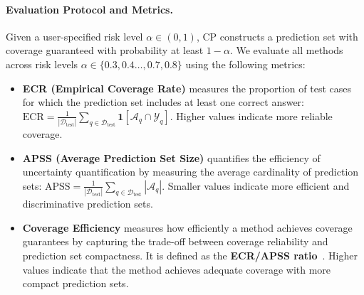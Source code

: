 \documentclass{article}
\theoremstyle{plain}
\theoremstyle{definition}
\theoremstyle{remark}
\begin{document}
\paragraph{Evaluation Protocol and Metrics.}
Given a user-specified risk level $\alpha \in (0,1)$, CP constructs a prediction set with coverage guaranteed with probability at least $1-\alpha$. We evaluate all methods across risk levels $\alpha \in \{ 0.3, 0.4 \ldots, 0.7, 0.8\}$ using the following metrics:
\vspace{-6pt}
\begin{itemize}[leftmargin=*,itemsep=-1pt]
\item \textbf{ECR (Empirical Coverage Rate)} measures the proportion of test cases for which the prediction set includes at least one correct answer:
$\text{ECR} = \frac{1}{|\mathcal{D}_{\text{test}}|} \sum_{q \in \mathcal{D}_{\text{test}}} \mathbf{1}\left[\mathcal{A}_q \cap \mathcal{Y}_q \right].$
Higher values indicate more reliable coverage.

\item \textbf{APSS (Average Prediction Set Size)} quantifies the efficiency of uncertainty quantification by measuring the average cardinality of prediction sets:
$\text{APSS} = \frac{1}{|\mathcal{D}_{\text{test}}|} \sum_{q \in \mathcal{D}_{\text{test}}} |\mathcal{A}_q|.$
Smaller values indicate more efficient and discriminative prediction sets. %
\item \textbf{Coverage Efficiency} measures how efficiently a method achieves coverage guarantees by capturing the trade-off between coverage reliability and 
prediction set compactness. It is defined as the \textbf{ECR/APSS ratio}~\cite{lin_CE}. Higher values indicate that the method achieves adequate coverage with more compact prediction sets. 

\end{itemize}
\end{document}
